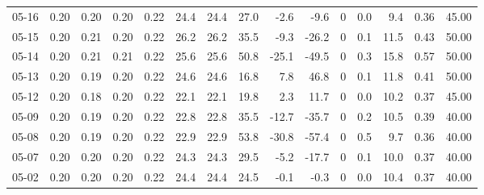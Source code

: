 \begin{threeparttable}
{\begin{tabular}{lrrrrrrrrrrrrrr}
  05-16 &          0.20 &          0.20 &          0.20 &        0.22 &                24.4 &               24.4 &                27.0 &       -2.6 &         -9.6 &              0 &                 0.0 &              9.4 &            0.36 &                  45.00 \\
  05-15 &          0.20 &          0.21 &          0.20 &        0.22 &                26.2 &               26.2 &                35.5 &       -9.3 &        -26.2 &              0 &                 0.1 &             11.5 &            0.43 &                  50.00 \\
  05-14 &          0.20 &          0.21 &          0.21 &        0.22 &                25.6 &               25.6 &                50.8 &      -25.1 &        -49.5 &              0 &                 0.3 &             15.8 &            0.57 &                  50.00 \\
  05-13 &          0.20 &          0.19 &          0.20 &        0.22 &                24.6 &               24.6 &                16.8 &        7.8 &         46.8 &              0 &                 0.1 &             11.8 &            0.41 &                  50.00 \\
  05-12 &          0.20 &          0.18 &          0.20 &        0.22 &                22.1 &               22.1 &                19.8 &        2.3 &         11.7 &              0 &                 0.0 &             10.2 &            0.37 &                  45.00 \\
  05-09 &          0.20 &          0.19 &          0.20 &        0.22 &                22.8 &               22.8 &                35.5 &      -12.7 &        -35.7 &              0 &                 0.2 &             10.5 &            0.39 &                  40.00 \\
  05-08 &          0.20 &          0.19 &          0.20 &        0.22 &                22.9 &               22.9 &                53.8 &      -30.8 &        -57.4 &              0 &                 0.5 &              9.7 &            0.36 &                  40.00 \\
  05-07 &          0.20 &          0.20 &          0.20 &        0.22 &                24.3 &               24.3 &                29.5 &       -5.2 &        -17.7 &              0 &                 0.1 &             10.0 &            0.37 &                  40.00 \\
  05-02 &          0.20 &          0.20 &          0.20 &        0.22 &                24.4 &               24.4 &                24.5 &       -0.1 &         -0.3 &              0 &                 0.0 &             10.4 &            0.37 &                  40.00 \\

\end{tabular}}
\end{threeparttable}
